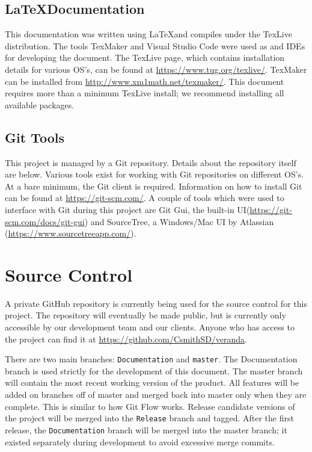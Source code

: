 \subsection{\LaTeX Documentation}
This documentation was written using \LaTeX and compiles under the TexLive distribution. The tools TexMaker and Visual Studio Code were used as and IDEs for developing the document.
The TexLive page, which contains installation details for various OS's, can be found at \url{https://www.tug.org/texlive/}. TexMaker can be installed from \url{http://www.xm1math.net/texmaker/}. This document requires more than a minimum TexLive install; we recommend installing all available packages.

\subsection{Git Tools}
This project is managed by a Git repository. Details about the repository itself are below. Various tools exist for working with Git repositories on different OS's. At a bare minimum, the Git client is required. Information on how to install Git can be found at \url{https://git-scm.com/}. A couple of tools which were used to interface with Git during this project are Git Gui, the built-in UI(\url{https://git-scm.com/docs/git-gui}) and SourceTree, a Windows/Mac UI by Atlassian (\url{https://www.sourcetreeapp.com/}).

\section{Source  Control}
A private GitHub repository is currently being used for the source control for this project. The repository will eventually be made public, but is currently only accessible by our development team and our clients. Anyone who has access to the project can find it at \url{https://github.com/CsmithSD/veranda}.

There are two main branches: \lstinline|Documentation| and \lstinline|master|. The Documentation branch is used strictly for the development of this document. The master branch will contain the most recent working version of the product. All features will be added on branches off of master and merged back into master only when they are complete. This is similar to how Git Flow works. Release candidate versions of the project will be merged into the \lstinline|Release| branch and tagged. After the first release, the \lstinline|Documentation| branch will be merged into the master branch; it existed separately during development to avoid excessive merge commits.

